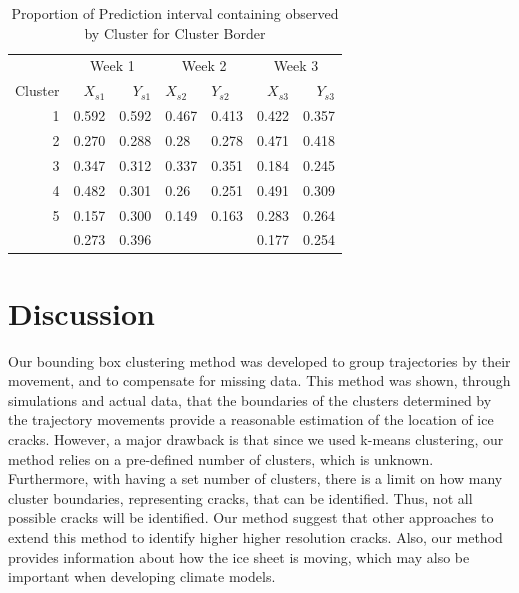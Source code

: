 \documentclass[12pt]{article}
\begin{document}
\begin{table}

\caption{\label{tab:cp-table-border-clust}Proportion of Prediction interval containing observed by Cluster for Cluster Border}
\centering
\begin{tabular}[t]{rrrllrr}
\toprule
\multicolumn{1}{c}{ } & \multicolumn{2}{c}{Week 1} & \multicolumn{2}{c}{Week 2} & \multicolumn{2}{c}{Week 3} \\
\cmidrule(l{3pt}r{3pt}){2-3} \cmidrule(l{3pt}r{3pt}){4-5} \cmidrule(l{3pt}r{3pt}){6-7}
Cluster & $X_{s1}$ & $Y_{s1}$ & $X_{s2}$ & $Y_{s2}$ & $X_{s3}$ & $Y_{s3}$\\
\midrule
1 & 0.592 & 0.592 & 0.467 & 0.413 & 0.422 & 0.357\\
2 & 0.270 & 0.288 & 0.28 & 0.278 & 0.471 & 0.418\\
3 & 0.347 & 0.312 & 0.337 & 0.351 & 0.184 & 0.245\\
4 & 0.482 & 0.301 & 0.26 & 0.251 & 0.491 & 0.309\\
5 & 0.157 & 0.300 & 0.149 & 0.163 & 0.283 & 0.264\\
\addlinespace
6 & 0.273 & 0.396 &  &  & 0.177 & 0.254\\
\bottomrule
\end{tabular}
\end{table}

\hypertarget{discussion}{%
\section{Discussion}\label{discussion}}

Our bounding box clustering method was developed to group trajectories
by their movement, and to compensate for missing data. This method was
shown, through simulations and actual data, that the boundaries of the
clusters determined by the trajectory movements provide a reasonable
estimation of the location of ice cracks. However, a major drawback is
that since we used k-means clustering, our method relies on a
pre-defined number of clusters, which is unknown. Furthermore, with
having a set number of clusters, there is a limit on how many cluster
boundaries, representing cracks, that can be identified. Thus, not all
possible cracks will be identified. Our method suggest that other
approaches to extend this method to identify higher higher resolution
cracks. Also, our method provides information about how the ice sheet is
moving, which may also be important when developing climate models.
\end{document}
